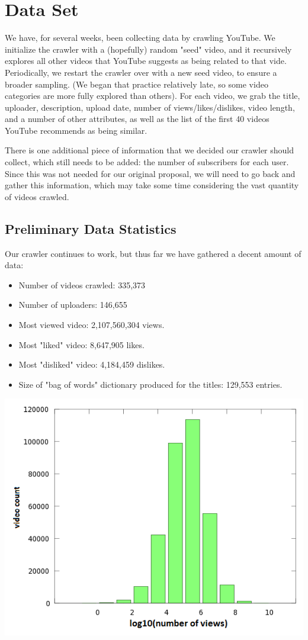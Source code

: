 \documentclass{article} %
\begin{document}
\section{Data Set}

We have, for several weeks, been collecting data by crawling YouTube.  We initialize the crawler with a (hopefully) random "seed" video, and it recursively explores all other videos that YouTube suggests as being related to that vide.  Periodically, we restart the crawler over with a new seed video, to ensure a broader sampling.  (We began that practice relatively late, so some video categories are more fully explored than others).  For each video, we grab the title, uploader, description, upload date, number of views/likes/dislikes, video length, and a number of other attributes, as well as the list of the first 40 videos YouTube recommends as being similar.

There is one additional piece of information that we decided our crawler should collect, which still needs to be added: the number of subscribers for each user.  Since this was not needed for our original proposal, we will need to go back and gather this information, which may take some time considering the vast quantity of videos crawled.

\subsection{Preliminary Data Statistics}

Our crawler continues to work, but thus far we have gathered a decent amount of data:

\begin{itemize}
\item Number of videos crawled: 335,373
\item Number of uploaders: 146,655
\item Most viewed video: 2,107,560,304 views.
\item Most "liked" video: 8,647,905 likes.
\item Most "disliked" video: 4,184,459 dislikes.
\item Size of "bag of words" dictionary produced for the titles: 129,553 entries.
\end{itemize}

\begin{center}
\includegraphics[width=.75\textwidth,clip]{DistributionOfViews.png}
\end{center}
\end{document}
